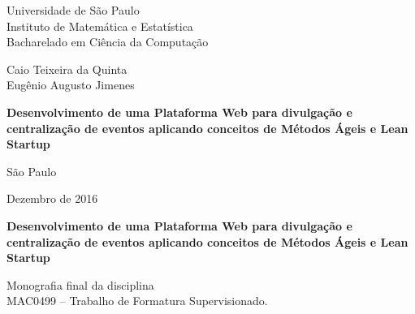 \documentclass[12pt,twoside,a4paper]{book}
\begin{document}
\frontmatter
\fancyhead[RO]{{\footnotesize\rightmark}\hspace{2em}\thepage}
\setcounter{tocdepth}{2}
\fancyhead[LE]{\thepage\hspace{2em}\footnotesize{\leftmark}}
\fancyhead[RE,LO]{}
\fancyhead[RO]{{\footnotesize\rightmark}\hspace{2em}\thepage}

\onehalfspacing  %

\thispagestyle{empty}
\begin{center}
    \vspace*{2.3cm}
    Universidade de São Paulo\\
    Instituto de Matemática e Estatística\\
    Bacharelado em Ciência da Computação


    \vspace*{3cm}
    \Large Caio Teixeira da Quinta \\ Eugênio Augusto Jimenes


    \vspace{3cm}
    \textbf{\Large{Desenvolvimento de uma Plataforma Web para divulgação e centralização de eventos aplicando conceitos de Métodos Ágeis e Lean Startup }}


    \vskip 5cm
    \normalsize{São Paulo}

    \normalsize{Dezembro de 2016}
\end{center}

%
\newpage
\thispagestyle{empty}
    \begin{center}
        \vspace*{2.3 cm}
        \textbf{\Large{Desenvolvimento de uma Plataforma Web para divulgação e centralização de eventos aplicando conceitos de Métodos Ágeis e Lean Startup }}
        \vspace*{2 cm}
    \end{center}

    \vskip 2cm

    \begin{flushright}
    Monografia final da disciplina \\
        MAC0499 -- Trabalho de Formatura Supervisionado.
    \end{flushright}
\end{document}

